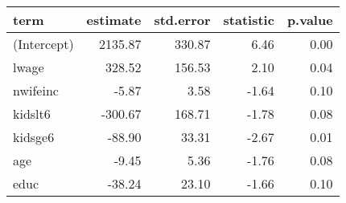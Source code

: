 \begin{tabular}{lrrrr}
  \hline
term & estimate & std.error & statistic & p.value \\ 
  \hline
(Intercept) & 2135.87 & 330.87 & 6.46 & 0.00 \\ 
  lwage & 328.52 & 156.53 & 2.10 & 0.04 \\ 
  nwifeinc & -5.87 & 3.58 & -1.64 & 0.10 \\ 
  kidslt6 & -300.67 & 168.71 & -1.78 & 0.08 \\ 
  kidsge6 & -88.90 & 33.31 & -2.67 & 0.01 \\ 
  age & -9.45 & 5.36 & -1.76 & 0.08 \\ 
  educ & -38.24 & 23.10 & -1.66 & 0.10 \\ 
   \hline
\end{tabular}
